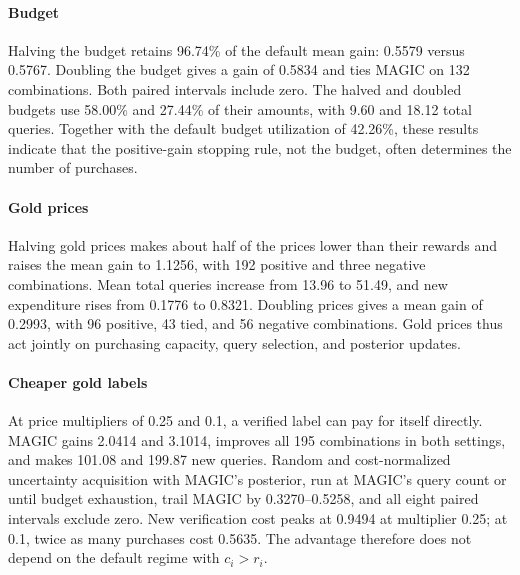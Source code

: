 \documentclass[journal]{IEEEtran}
\begin{document}
\paragraph{Budget}
Halving the budget retains 96.74\% of the default mean gain: 0.5579 versus 0.5767. Doubling the budget gives a gain of 0.5834 and ties MAGIC on 132 combinations. Both paired intervals include zero. The halved and doubled budgets use 58.00\% and 27.44\% of their amounts, with 9.60 and 18.12 total queries. Together with the default budget utilization of 42.26\%, these results indicate that the positive-gain stopping rule, not the budget, often determines the number of purchases.

\paragraph{Gold prices}
Halving gold prices makes about half of the prices lower than their rewards and raises the mean gain to 1.1256, with 192 positive and three negative combinations. Mean total queries increase from 13.96 to 51.49, and new expenditure rises from 0.1776 to 0.8321. Doubling prices gives a mean gain of 0.2993, with 96 positive, 43 tied, and 56 negative combinations. Gold prices thus act jointly on purchasing capacity, query selection, and posterior updates.

\paragraph{Cheaper gold labels}
At price multipliers of 0.25 and 0.1, a verified label can pay for itself directly. MAGIC gains 2.0414 and 3.1014, improves all 195 combinations in both settings, and makes 101.08 and 199.87 new queries. Random and cost-normalized uncertainty acquisition with MAGIC's posterior, run at MAGIC's query count or until budget exhaustion, trail MAGIC by 0.3270--0.5258, and all eight paired intervals exclude zero. New verification cost peaks at 0.9494 at multiplier 0.25; at 0.1, twice as many purchases cost 0.5635. The advantage therefore does not depend on the default regime with $c_i>r_i$.
\end{document}
